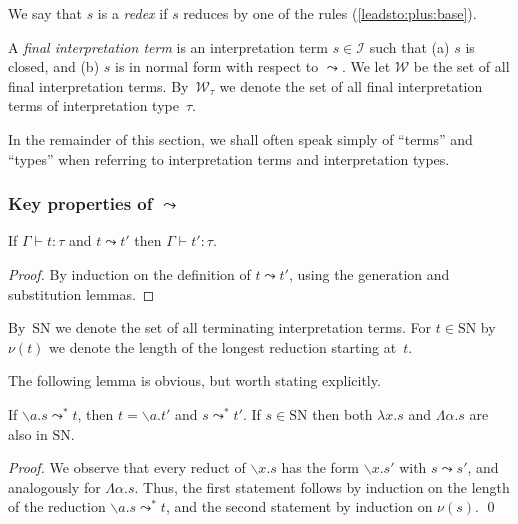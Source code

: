 \documentclass[runningheads,a4paper]{llncs}
\newcommand{\Iterms}{\mathcal{I}}
\newcommand{\World}{\mathcal{W}}
\newcommand{\abs}[2]{\lambda #1.#2}
\newcommand{\tabs}[2]{\Lambda #1.#2}
\newcommand{\abstraction}[2]{\backslash #1.#2}
\newcommand{\SN}{\mathrm{SN}}
\begin{document}
\begin{definition}
  We say that $s$ is a \emph{redex} if $s$ reduces by one of the rules
  (\ref{leadsto:plus:base}).

  A \emph{final interpretation term} is an interpretation term
  $s \in \Iterms$ such that (a) $s$ is closed, and (b) $s$ is in
  normal form with respect to $\leadsto$.  We let $\World$ be the set
  of all final interpretation terms. By~$\World_\tau$ we denote the
  set of all final interpretation terms of interpretation type~$\tau$.
\end{definition}

In the remainder of this section, we shall often speak simply of
``terms'' and ``types'' when referring to interpretation terms and
interpretation types.

\subsubsection{Key properties of $\leadsto$}

\begin{lemma}
  If $\Gamma \vdash t : \tau$ and $t \leadsto t'$ then
  $\Gamma \vdash t' : \tau$.
\end{lemma}

\begin{proof}
  By induction on the definition of $t \leadsto t'$, using the
  generation and substitution lemmas.
\end{proof}

By~$\SN$ we denote the set of all terminating interpretation
terms. For $t \in \SN$ by~$\nu(t)$ we denote the length of the longest
reduction starting at~$t$.

The following lemma is obvious, but worth stating explicitly.

\begin{lemma}\label{lem_reduce_abs}
  If $\abstraction{a}{s} \leadsto^* t$, then $t = \abstraction{a}{t'}$
  and $s \leadsto^* t'$.  If $s \in \SN$ then both $\abs{x}{s}$ and
  $\tabs{\alpha}{s}$ are also in $\SN$.
\end{lemma}

\begin{proof}
  We observe that every reduct of $\abstraction{x}{s}$ has the form
  $\abstraction{x}{s'}$ with $s \leadsto s'$, and analogously for
  $\tabs{\alpha}{s}$.  Thus, the first statement follows by induction
  on the length of the reduction $\abstraction{a}{s} \leadsto^* t$,
  and the second statement by induction on $\nu(s)$.  \qed
\end{proof}
\end{document}
